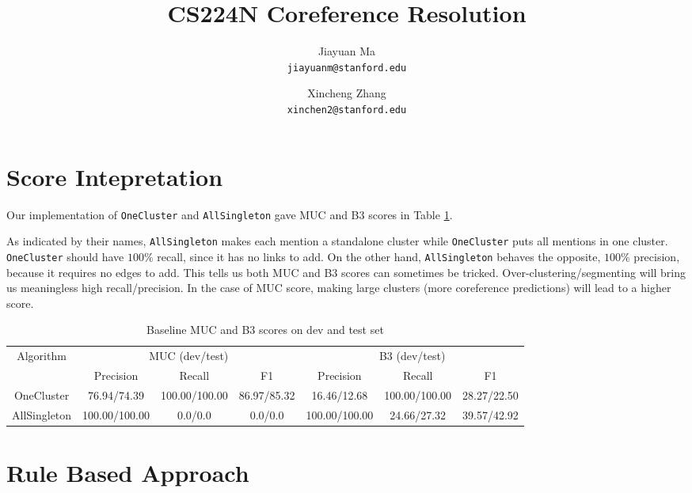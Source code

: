 \documentclass[letterpaper]{article}
\begin{document}
\title{CS224N Coreference Resolution}
\author{
        Jiayuan Ma \\
        \texttt{jiayuanm@stanford.edu}
        \and
        Xincheng Zhang\\
        \texttt{xinchen2@stanford.edu}
}
\maketitle

\section{Score Intepretation}
Our implementation of \texttt{OneCluster} and \texttt{AllSingleton} gave MUC and B3 scores in Table \ref{tab:baseline}.

As indicated by their names, \texttt{AllSingleton} makes each mention a standalone cluster while \texttt{OneCluster} puts all mentions in one cluster. \texttt{OneCluster} should have $100\%$ recall, since it has no links to add. On the other hand, \texttt{AllSingleton} behaves the opposite, $100\%$ precision, because it requires no edges to add.
This tells us both MUC and B3 scores can sometimes be tricked. Over-clustering/segmenting will bring us meaningless high recall/precision. In the case of MUC score, making large clusters (more coreference predictions) will lead to a higher score.
\begin{table}[h]
\begin{center}
\begin{tabular}{|c|c|c|c|c|c|c|}
\hline
\multirow{2}{*}{Algorithm} & 
\multicolumn{3}{c|}{MUC (dev/test)} & \multicolumn{3}{c|}{B3 (dev/test)}  \\
\hhline{~------}
& Precision & Recall & F1 & Precision & Recall & F1 \\
\hline
OneCluster & 76.94/74.39 & 100.00/100.00  & 86.97/85.32 & 16.46/12.68 & 100.00/100.00 & 28.27/22.50 \\
\hline
AllSingleton & 100.00/100.00 & 0.0/0.0 & 0.0/0.0 & 100.00/100.00 & 24.66/27.32 & 39.57/42.92 \\
\hline
\end{tabular}
\caption{Baseline MUC and B3 scores on dev and test set}\label{tab:baseline}
\end{center}
\end{table}

\section{Rule Based Approach}
\end{document}
